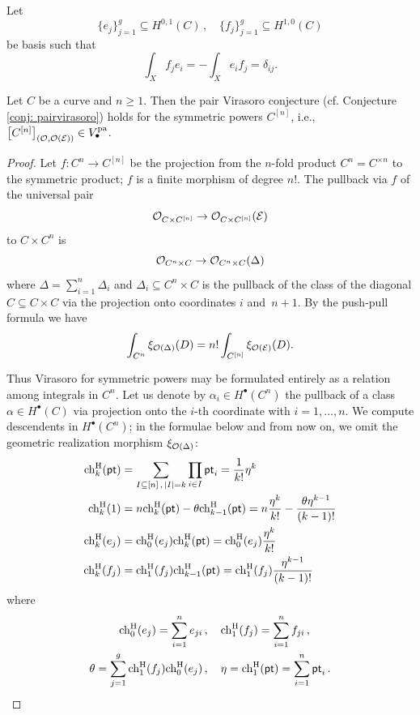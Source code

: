 \documentclass[a4paper, 12pt]{amsart}
\begin{document}
Let 
\[\{e_j\}_{j=1}^g\subseteq H^{0,1}(C)\,,\quad \{f_j\}_{j=1}^g\subseteq H^{1,0}(C)\]
be basis such that
\[\int_X f_je_i=-\int_X e_if_j=\delta_{ij}.\]
\begin{proposition}
\label{prop: symmetricpowers}
Let $C$ be a curve and $n\geq 1$. Then the pair Virasoro conjecture (cf. Conjecture \ref{conj: pairvirasoro}) holds for the symmetric powers $C^{[n]}$, i.e., $\big[C^{[n]}\big]_{({\mathcal O}, {\mathcal O}({\mathcal E}))}\in V_\bullet^{\mathop{\rm pa}\nolimits}$.
\end{proposition}


\begin{proof}

Let $f\colon C^{n}\to C^{[n]}$ be the projection from the $n$-fold product $C^n=C^{\times n}$ to the symmetric product; $f$ is a finite morphism of degree $n!$. The pullback via $f$ of the universal pair \[{\mathcal O}_{C\times C^{[n]}}\to {\mathcal O}_{C\times C^{[n]}}(\mathcal E)\]
to $C\times C^n$ is
\[{\mathcal O}_{C^{n}\times C}\to {\mathcal O}_{C^{n}\times C}( \Delta)\]
where $\Delta=\sum_{i=1}^n \Delta_i$ and $\Delta_i\subseteq C^n \times C$ is the pullback of the class of the diagonal $C\subseteq C\times C$ via the projection onto coordinates $i$ and~$n+1$. By the push-pull formula we have
\[\int_{C^n} \xi_{{\mathcal O}(\Delta)}(D)=n!\int_{C^{[n]}}\xi_{{\mathcal O}(\mathcal E)}(D).\]

Thus Virasoro for symmetric powers may be formulated entirely as a relation among integrals in $C^n$. Let us denote by $\alpha_i\in H^\bullet(C^n)$ the pullback of a class $\alpha\in H^\bullet(C)$ via projection onto the $i$-th coordinate with $i=1,\ldots, n$. We compute descendents in $H^\bullet(C^n)$; in the formulae below and from now on, we omit the geometric realization morphism $\xi_{{\mathcal O}(\Delta)}$:
\begin{align*}
\mathrm{ch}_k^{\mathrm{H}}({\mathsf{pt}})&=\sum_{I\subseteq [n]\,, \,|I|=k}\prod_{i\in I}{\mathsf{pt}}_i=\frac{1}{k!}\eta^k\\
\mathrm{ch}_k^{\mathrm{H}}(1)&=n\mathrm{ch}_k^{\mathrm{H}}({\mathsf{pt}})-\theta \mathrm{ch}_{k-1}^{\mathrm{H}}({\mathsf{pt}})=n\frac{ \eta^k}{k!}-\frac{\theta\eta^{k-1}}{(k-1)!}\\
\mathrm{ch}_k^{\mathrm{H}}(e_j)&=\mathrm{ch}_0^{\mathrm{H}}(e_j)\mathrm{ch}_k^{\mathrm{H}}({\mathsf{pt}})=\mathrm{ch}_0^{\mathrm{H}}(e_j)\frac{\eta^k}{k!}\\
\mathrm{ch}_k^{\mathrm{H}}(f_j)&=\mathrm{ch}_1^{\mathrm{H}}(f_j)\mathrm{ch}_{k-1}^{\mathrm{H}}({\mathsf{pt}})=\mathrm{ch}_1^{\mathrm{H}}(f_j)\frac{\eta^{k-1}}{(k-1)!}
\end{align*}
where 
\begin{align*}
    \mathrm{ch}_0^{\mathrm{H}}(e_j)=\sum_{i=1}^n e_{ji}\,&, \quad
    \mathrm{ch}_1^{\mathrm{H}}(f_j)=\sum_{i=1}^n f_{ji}\, , \\
   \theta=\sum_{j=1}^g\mathrm{ch}_1^{\mathrm{H}}(f_j)\mathrm{ch}_0^{\mathrm{H}}(e_j)\, &, \quad\eta=\mathrm{ch}_1^{\mathrm{H}}({\mathsf{pt}})=\sum_{i=1}^n {\mathsf{pt}}_i\,. 
\end{align*}


\end{proof}
\end{document}
